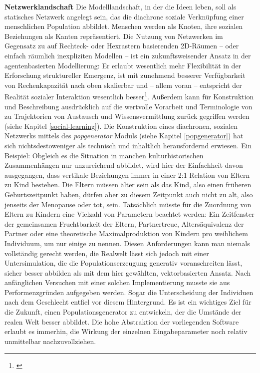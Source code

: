\documentclass[openany,twoside,twocolumn]{book}
\let\rmarkdownfootnote\footnote%
\def\footnote{\protect\rmarkdownfootnote}
\begin{document}
\textbf{Netzwerklandschaft} \newline  Die Modelllandschaft, in der die
Ideen leben, soll als statisches Netzwerk angelegt sein, das die
diachrone soziale Verknüpfung einer menschlichen Population abbildet.
Menschen werden als Knoten, ihre sozialen Beziehungen als Kanten
repräsentiert. Die Nutzung von Netzwerken im Gegensatz zu auf Rechteck-
oder Hexrastern basierenden 2D-Räumen -- oder einfach räumlich
inexpliziten Modellen -- ist ein zukunftsweisender Ansatz in der
agentenbasierten Modellierung: Er erlaubt wesentlich mehr Flexibilität
in der Erforschung struktureller Emergenz, ist mit zunehmend besserer
Verfügbarkeit von Rechenkapazität nach oben skalierbar und -- allem
voran -- entspricht der Realität sozialer Interaktion wesentlich
besser\footnote{\textcite{lehmann_complex_2018}}. Außerdem kann für
Konstruktion und Beschreibung ausdrücklich auf die wertvolle Vorarbeit
und Terminologie von \textcite{cavalli-sforza_cultural_1981} zu
Trajektorien von Austausch und Wissensvermittlung zurück gegriffen
werden (siehe Kapitel \ref{social-learning}). Die Konstruktion eines
diachronen, sozialen Netzwerks mittels des \emph{popgenerator} Moduls
(siehe Kapitel \ref{popgenerator}) hat sich nichtsdestoweniger als
technisch und inhaltlich herausfordernd erwiesen. Ein Beispiel: Obgleich
es die Situation in manchen kulturhistorischen Zusammenhängen nur
unzureichend abbildet, wird hier der Einfachheit davon ausgegangen, dass
vertikale Beziehungen immer in einer 2:1 Relation von Eltern zu Kind
bestehen. Die Eltern müssen älter sein als das Kind, also einen früheren
Geburtszeitpunkt haben, dürfen aber zu diesem Zeitpunkt auch nicht zu
alt, also jenseits der Menopause oder tot, sein. Tatsächlich müsste für
die Zuordnung von Eltern zu Kindern eine Vielzahl von Parametern
beachtet werden: Ein Zeitfenster der gemeinsamen Fruchtbarkeit der
Eltern, Partnertreue, Altersäquivalenz der Partner oder eine
theoretische Maximalproduktion von Kindern pro weiblichem Individuum, um
nur einige zu nennen. Diesen Anforderungen kann man niemals vollständig
gerecht werden, die Realwelt lässt sich jedoch mit einer
Untersimulation, die die Populationserzeugung generativ voranschreiten
lässt, sicher besser abbilden als mit dem hier gewählten,
vektorbasierten Ansatz. Nach anfänglichen Versuchen mit einer solchen
Implementierung musste sie aus Performenzgründen aufgegeben werden.
Sogar die Unterscheidung der Individuen nach dem Geschlecht entfiel vor
diesem Hintergrund. Es ist ein wichtiges Ziel für die Zukunft, einen
Populationsgenerator zu entwickeln, der die Umstände der realen Welt
besser abbildet. Die hohe Abstraktion der vorliegenden Software erlaubt
es immerhin, die Wirkung der einzelnen Eingabeparameter noch relativ
unmittelbar nachzuvollziehen.
\end{document}
